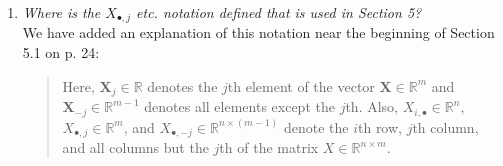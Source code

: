 \documentclass[12pt]{article}
\begin{document}
\begin{enumerate}
	
	\item \textsl{Where is the $X_{\bullet, j}$ etc. notation defined that is used in Section 5?} \\
	
	We have added an explanation of this notation near the beginning of Section 5.1 on p. 24:
	\begin{quote}
	Here, $\bm X_j \in \mathbb R$ denotes the $j$th element of the vector $\bm X \in \mathbb R^m$ and $\bm X_{-j} \in \mathbb R^{m-1}$ denotes all elements except the $j$th. Also, $X_{i,\bullet} \in \mathbb R^{n}$, $X_{\bullet, j} \in \mathbb R^m$, and $X_{\bullet, -j} \in \mathbb R^{n \times (m-1)}$ denote the $i$th row, $j$th column, and all columns but the $j$th of the matrix $X \in \mathbb R^{n \times m}$. 
	\end{quote}
	
\end{enumerate}
\end{document}
